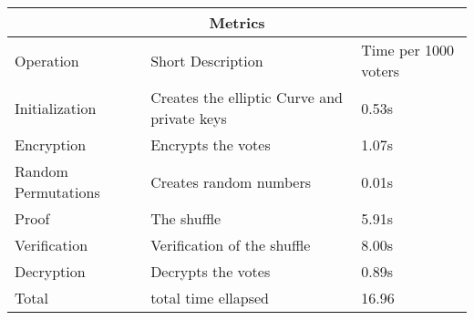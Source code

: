 \begin{tabular}{ |p{3cm}|p{5cm}|p{3cm}|  }
    \hline
    \multicolumn{3}{|c|}{Metrics}\\
    \hline
    Operation & Short Description & Time per 1000 voters\\
    \hline
    Initialization & Creates the elliptic Curve and private keys & 0.53s\\
    Encryption & Encrypts the votes & 1.07s\\
    Random Permutations & Creates random numbers & 0.01s\\
    Proof & The shuffle & 5.91s\\
    Verification & Verification of the shuffle & 8.00s\\
    Decryption & Decrypts the votes & 0.89s\\
    Total & total time ellapsed & 16.96\\
    \hline
\end{tabular}
